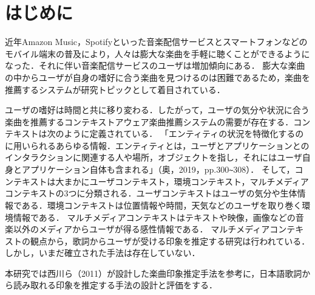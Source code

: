 \documentclass[a4paper,10pt,twocolumn]{jsarticle}
\begin{document}
\section{はじめに}
近年Amazon Music，Spotifyといった音楽配信サービスとスマートフォンなどのモバイル端末の普及により，人々は膨大な楽曲を手軽に聴くことができるようになった．それに伴い音楽配信サービスのユーザは増加傾向にある\cite{1}．
膨大な楽曲の中からユーザが自身の嗜好に合う楽曲を見つけるのは困難であるため，楽曲を推薦するシステムが研究トピックとして着目されている．

ユーザの嗜好は時間と共に移り変わる．したがって，ユーザの気分や状況に合う楽曲を推薦するコンテキストアウェア楽曲推薦システムの需要が存在する．コンテキストは次のように定義されている．
「エンティティの状況を特徴化するのに用いられるあらゆる情報．エンティティとは，ユーザとアプリケーションとのインタラクションに関連する人や場所，オブジェクトを指し，それにはユーザ自身とアプリケーション自体も含まれる」（奥，2019，pp.300\verb+~+308）．
そして，コンテキストは大まかにユーザコンテキスト，環境コンテキスト，マルチメディアコンテキストの3つに分類される．ユーザコンテキストはユーザの気分や生体情報である．環境コンテキストは位置情報や時間，天気などのユーザを取り巻く環境情報である．
マルチメディアコンテキストはテキストや映像，画像などの音楽以外のメディアからユーザが得る感性情報である．
マルチメディアコンテキストの観点から，歌詞からユーザが受ける印象を推定する研究は行われている．しかし，いまだ確立された手法は存在していない．

本研究では西川ら（2011）\cite{3}が設計した楽曲印象推定手法を参考に，日本語歌詞から読み取れる印象を推定する手法の設計と評価をする．
%
\end{document}
